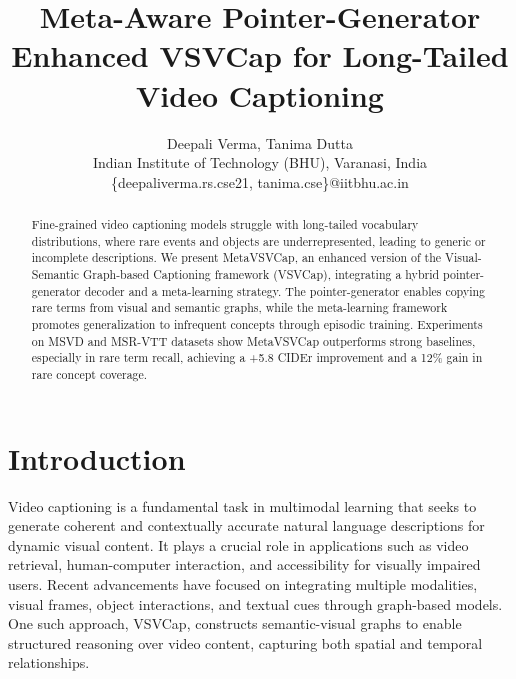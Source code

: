 \documentclass[journal]{IEEEtran}
\title{Meta-Aware Pointer-Generator Enhanced VSVCap for Long-Tailed Video Captioning}
\author{Deepali Verma, Tanima Dutta \\
Indian Institute of Technology (BHU), Varanasi, India \\
\{deepaliverma.rs.cse21, tanima.cse\}@iitbhu.ac.in}
\begin{document}
\maketitle

\begin{abstract}
Fine-grained video captioning models struggle with long-tailed vocabulary distributions, where rare events and objects are underrepresented, leading to generic or incomplete descriptions. We present MetaVSVCap, an enhanced version of the Visual-Semantic Graph-based Captioning framework (VSVCap), integrating a hybrid pointer-generator decoder and a meta-learning strategy. The pointer-generator enables copying rare terms from visual and semantic graphs, while the meta-learning framework promotes generalization to infrequent concepts through episodic training. Experiments on MSVD and MSR-VTT datasets show MetaVSVCap outperforms strong baselines, especially in rare term recall, achieving a +5.8 CIDEr improvement and a 12\% gain in rare concept coverage.
\end{abstract}



\section{Introduction}
Video captioning is a fundamental task in multimodal learning that seeks to generate coherent and contextually accurate natural language descriptions for dynamic visual content. It plays a crucial role in applications such as video retrieval, human-computer interaction, and accessibility for visually impaired users. Recent advancements have focused on integrating multiple modalities, visual frames, object interactions, and textual cues through graph-based models. One such approach, VSVCap, constructs semantic-visual graphs to enable structured reasoning over video content, capturing both spatial and temporal relationships.
\end{document}

